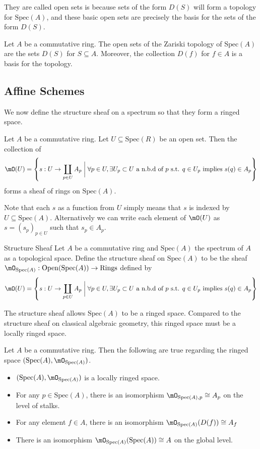 \documentclass[a4paper]{article}
\begin{document}
They are called open sets is because sets of the form $D(S)$ will form a topology for $\text{Spec}(A)$, and these basic open sets are precisely the basis for the sets of the form $D(S)$. 

\begin{thm}{}{} Let $A$ be a commutative ring. The open sets of the Zariski topology of $\text{Spec}(A)$ are the sets $D(S)$ for $S\subseteq A$. Moreover, the collection $D(f)$ for $f\in A$ is a basis for the topology. 
\end{thm}

\subsection{Affine Schemes}
We now define the structure sheaf on a spectrum so that they form a ringed space. 

\begin{thm}{}{} Let $A$ be a commutative ring. Let $U\subseteq\text{Spec}(R)$ be an open set. Then the collection of $$\mO(U)=\left\{s:U\to\coprod_{p\in U}A_p\;\bigg{|}\;\forall p\in U, \exists U_p\subset U\text{ a n.b.d of }p\text{ s.t. }q\in U_p\text{ implies }s(q)\in A_p\right\}$$ forms a sheaf of rings on $\text{Spec}(A)$. 
\end{thm}

Note that each $s$ as a function from $U$ simply means that $s$ is indexed by $U\subseteq\text{Spec}(A)$. Alternatively we can write each element of $\mO(U)$ as $s=(s_p)_{p\in U}$ such that $s_p\in A_p$. 

\begin{defn}{Structure Sheaf}{} Let $A$ be a commutative ring and $\text{Spec}(A)$ the spectrum of $A$ as a topological space. Define the structure sheaf on $\text{Spec}(A)$ to be the sheaf $\mO_{\text{Spec}(A)}:\text{Open}(\text{Spec}(A))\to\text{Rings}$ defined by $$\mO(U)=\left\{s:U\to\coprod_{p\in U}A_p\;\bigg{|}\;\forall p\in U, \exists U_p\subset U\text{ a n.b.d of }p\text{ s.t. }q\in U_p\text{ implies }s(q)\in A_p\right\}$$
\end{defn}

The structure sheaf allows $\text{Spec}(A)$ to be a ringed space. Compared to the structure sheaf on classical algebraic geometry, this ringed space must be a locally ringed space. 

\begin{prp}{}{} Let $A$ be a commutative ring. Then the following are true regarding the ringed space $(\text{Spec}(A),\mO_{\text{Spec}(A)})$. 
\begin{itemize}
\item $(\text{Spec}(A),\mO_{\text{Spec}(A)})$ is a locally ringed space. 
\item For any $p\in\text{Spec}(A)$, there is an isomorphism $\mO_{\text{Spec}(A),p}\cong A_p$ on the level of stalks. 
\item For any element $f\in A$, there is an isomorphism $\mO_{\text{Spec}(A)}(D(f))\cong A_f$
\item There is an isomorphism $\mO_{\text{Spec}(A)}(\text{Spec}(A))\cong A$ on the global level. 
\end{itemize}
\end{prp}
\end{document}
